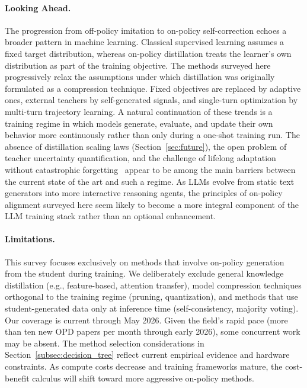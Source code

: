 \documentclass{article} %
\begin{document}
\paragraph{Looking Ahead.} The progression from off-policy imitation to on-policy self-correction echoes a broader pattern in machine learning. Classical supervised learning assumes a fixed target distribution, whereas on-policy distillation treats the learner's own distribution as part of the training objective. The methods surveyed here progressively relax the assumptions under which distillation was originally formulated as a compression technique. Fixed objectives are replaced by adaptive ones, external teachers by self-generated signals, and single-turn optimization by multi-turn trajectory learning. A natural continuation of these trends is a training regime in which models generate, evaluate, and update their own behavior more continuously rather than only during a one-shot training run. The absence of distillation scaling laws (Section~\ref{sec:future}), the open problem of teacher uncertainty quantification, and the challenge of lifelong adaptation without catastrophic forgetting~\citep{kirkpatrick2017overcoming} appear to be among the main barriers between the current state of the art and such a regime. As LLMs evolve from static text generators into more interactive reasoning agents, the principles of on-policy alignment surveyed here seem likely to become a more integral component of the LLM training stack rather than an optional enhancement.

\paragraph{Limitations.} This survey focuses exclusively on methods that involve on-policy generation from the student during training. We deliberately exclude general knowledge distillation (e.g., feature-based, attention transfer), model compression techniques orthogonal to the training regime (pruning, quantization), and methods that use student-generated data only at inference time (self-consistency, majority voting). Our coverage is current through May 2026. Given the field's rapid pace (more than ten new OPD papers per month through early 2026), some concurrent work may be absent. The method selection considerations in Section~\ref{subsec:decision_tree} reflect current empirical evidence and hardware constraints. As compute costs decrease and training frameworks mature, the cost-benefit calculus will shift toward more aggressive on-policy methods.
\end{document}
